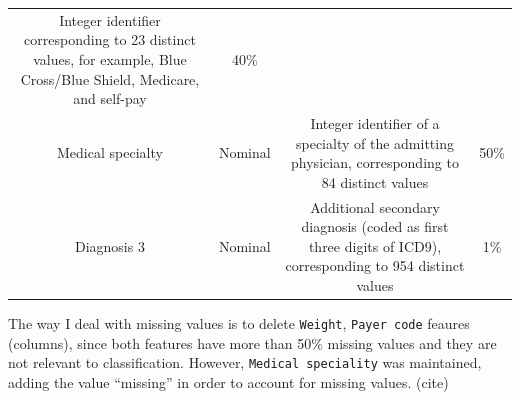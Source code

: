 \documentclass[]{article}
\newenvironment{Shaded}{\begin{snugshade}}{\end{snugshade}}
\newcommand{\KeywordTok}[1]{\textcolor[rgb]{0.13,0.29,0.53}{\textbf{{#1}}}}
\newcommand{\DataTypeTok}[1]{\textcolor[rgb]{0.13,0.29,0.53}{{#1}}}
\newcommand{\DecValTok}[1]{\textcolor[rgb]{0.00,0.00,0.81}{{#1}}}
\newcommand{\StringTok}[1]{\textcolor[rgb]{0.31,0.60,0.02}{{#1}}}
\newcommand{\NormalTok}[1]{{#1}}
\begin{document}
\begin{longtable}[c]{@{}cccc@{}}
\begin{minipage}[t]{0.35\columnwidth}
Integer identifier corresponding to 23 distinct values, for example,
Blue Cross/Blue Shield, Medicare, and self-pay
\strut\end{minipage} &
\begin{minipage}[t]{0.24\columnwidth}\centering\strut
40\%
\strut\end{minipage}\tabularnewline
\begin{minipage}[t]{0.20\columnwidth}\centering\strut
Medical specialty
\strut\end{minipage} &
\begin{minipage}[t]{0.09\columnwidth}\centering\strut
Nominal
\strut\end{minipage} &
\begin{minipage}[t]{0.35\columnwidth}\centering\strut
Integer identifier of a specialty of the admitting physician,
corresponding to 84 distinct values
\strut\end{minipage} &
\begin{minipage}[t]{0.24\columnwidth}\centering\strut
50\%
\strut\end{minipage}\tabularnewline
\begin{minipage}[t]{0.20\columnwidth}\centering\strut
Diagnosis 3
\strut\end{minipage} &
\begin{minipage}[t]{0.09\columnwidth}\centering\strut
Nominal
\strut\end{minipage} &
\begin{minipage}[t]{0.35\columnwidth}\centering\strut
Additional secondary diagnosis (coded as first three digits of ICD9),
corresponding to 954 distinct values
\strut\end{minipage} &
\begin{minipage}[t]{0.24\columnwidth}\centering\strut
1\%
\strut\end{minipage}\tabularnewline
\bottomrule
\end{longtable}

The way I deal with missing values is to delete \texttt{Weight},
\texttt{Payer code} feaures (columns), since both features have more
than 50\% missing values and they are not relevant to classification.
However, \texttt{Medical speciality} was maintained, adding the value
``missing'' in order to account for missing values. (cite)

\begin{Shaded}
\end{Shaded}
\end{document}
